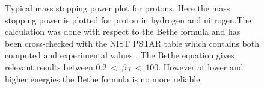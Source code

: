 \begin{figure}[!ht]
	
	\caption[Typical mass stopping power plot for protons]{Typical mass stopping power plot for protons. Here the mass stopping power is plotted for proton in hydrogen and nitrogen.The calculation was done with respect to the Bethe formula and has been cross-checked with the NIST PSTAR table which contains both computed and experimental values \cite{Seltzer1993}. The Bethe equation gives relevant results between \(0.2\ <\ \beta\gamma\ <\ 100\). However at lower and higher energies the Bethe formula is no more reliable.}
	\label{chap3:bethe1}
\end{figure}

